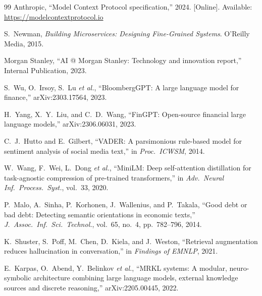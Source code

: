 \documentclass[10pt,journal,compsoc]{IEEEtran}
\begin{document}
\begin{thebibliography}{99}
Anthropic,
``Model Context Protocol specification,''
2024. [Online]. Available: \url{https://modelcontextprotocol.io}

S.~Newman,
\emph{Building Microservices: Designing Fine-Grained Systems}.
O'Reilly Media, 2015.

Morgan Stanley,
``AI @ Morgan Stanley: Technology and innovation report,''
Internal Publication, 2023.

S.~Wu, O.~Irsoy, S.~Lu \emph{et al.},
``BloombergGPT: A large language model for finance,''
arXiv:2303.17564, 2023.

H.~Yang, X.~Y.~Liu, and C.~D.~Wang,
``FinGPT: Open-source financial large language models,''
arXiv:2306.06031, 2023.

C.~J.~Hutto and E.~Gilbert,
``VADER: A parsimonious rule-based model for sentiment analysis of
social media text,''
in \emph{Proc.\ ICWSM}, 2014.

W.~Wang, F.~Wei, L.~Dong \emph{et al.},
``MiniLM: Deep self-attention distillation for task-agnostic compression
of pre-trained transformers,''
in \emph{Adv.\ Neural Inf.\ Process.\ Syst.}, vol.~33, 2020.

P.~Malo, A.~Sinha, P.~Korhonen, J.~Wallenius, and P.~Takala,
``Good debt or bad debt: Detecting semantic orientations in economic
texts,''
\emph{J.~Assoc.\ Inf.\ Sci.\ Technol.}, vol.~65, no.~4,
pp.~782--796, 2014.

K.~Shuster, S.~Poff, M.~Chen, D.~Kiela, and J.~Weston,
``Retrieval augmentation reduces hallucination in conversation,''
in \emph{Findings of EMNLP}, 2021.

E.~Karpas, O.~Abend, Y.~Belinkov \emph{et al.},
``MRKL systems: A modular, neuro-symbolic architecture combining large
language models, external knowledge sources and discrete reasoning,''
arXiv:2205.00445, 2022.

\end{thebibliography}
\end{document}
